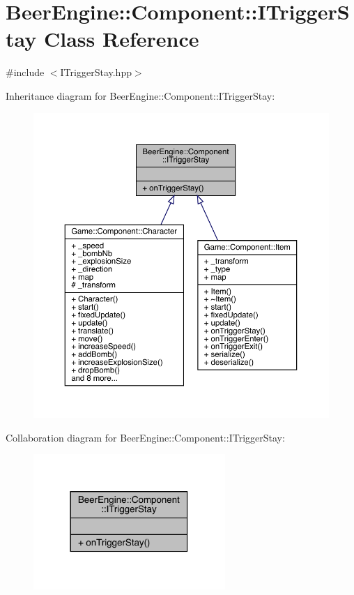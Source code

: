\hypertarget{class_beer_engine_1_1_component_1_1_i_trigger_stay}{}\section{Beer\+Engine\+:\+:Component\+:\+:I\+Trigger\+Stay Class Reference}
\label{class_beer_engine_1_1_component_1_1_i_trigger_stay}


{\ttfamily \#include $<$I\+Trigger\+Stay.\+hpp$>$}



Inheritance diagram for Beer\+Engine\+:\+:Component\+:\+:I\+Trigger\+Stay\+:\nopagebreak
\begin{figure}[H]
\begin{center}
\leavevmode
\includegraphics[width=350pt]{class_beer_engine_1_1_component_1_1_i_trigger_stay__inherit__graph}
\end{center}
\end{figure}


Collaboration diagram for Beer\+Engine\+:\+:Component\+:\+:I\+Trigger\+Stay\+:\nopagebreak
\begin{figure}[H]
\begin{center}
\leavevmode
\includegraphics[width=206pt]{class_beer_engine_1_1_component_1_1_i_trigger_stay__coll__graph}
\end{center}
\end{figure}
